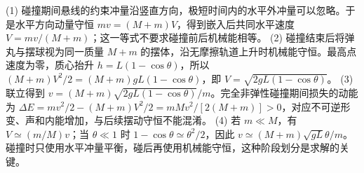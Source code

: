 (1) 碰撞期间悬线的约束冲量沿竖直方向，极短时间内的水平外冲量可以忽略。于是水平方向动量守恒 \(mv=(M+m)V\)，得到嵌入后共同水平速度 \(V=mv/(M+m)\)；这一等式不要求碰撞前后机械能相等。
(2) 碰撞结束后将弹丸与摆球视为同一质量 \(M+m\) 的摆体，沿无摩擦轨道上升时机械能守恒。最高点速度为零，质心抬升 \(h=L(1-\cos\theta)\)，所以 \((M+m)V^2/2=(M+m)gL(1-\cos\theta)\)，即 \(V=\sqrt{2gL(1-\cos\theta)}\)。
(3) 联立得到 \(v=(M+m)\sqrt{2gL(1-\cos\theta)}/m\)。完全非弹性碰撞期间损失的动能为 \(\Delta E=mv^2/2-(M+m)V^2/2=mMv^2/[2(M+m)]>0\)，对应不可逆形变、声和内能增加，与后续摆动守恒不能混淆。
(4) 若 \(m\ll M\)，有 \(V\simeq(m/M)v\)；当 \(\theta\ll1\) 时 \(1-\cos\theta\simeq\theta^2/2\)，因此 \(v\simeq(M+m)\sqrt{gL}\theta/m\)。碰撞时只使用水平冲量平衡，碰后再使用机械能守恒，这种阶段划分是求解的关键。
